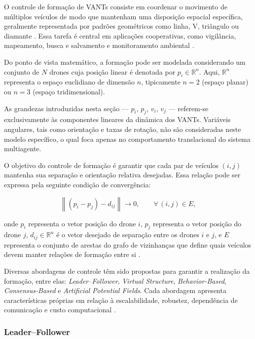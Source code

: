 O controle de formação de VANTs consiste em coordenar o movimento de múltiplos veículos de modo que mantenham uma disposição espacial específica, geralmente representada por padrões geométricos como linha, V, triângulo ou diamante \citep{bu2024advancement}. Essa tarefa é central em aplicações cooperativas, como vigilância, mapeamento, busca e salvamento e monitoramento ambiental \citep{bu2024advancement, ouyang2023formation}.

Do ponto de vista matemático, a formação pode ser modelada considerando um conjunto de $N$ drones cuja posição linear é denotada por $p_i \in \mathbb{R}^n$. Aqui, $\mathbb{R}^n$ representa o espaço euclidiano de dimensão $n$, tipicamente $n = 2$ (espaço planar) ou $n = 3$ (espaço tridimensional).

As grandezas introduzidas nesta seção — $p_i$, $p_j$, $v_i$, $v_j$ — referem-se exclusivamente às componentes lineares da dinâmica dos VANTs. Variáveis angulares, tais como orientação e taxas de rotação, não são consideradas neste modelo específico, o qual foca apenas no comportamento translacional do sistema multiagente.

O objetivo do controle de formação é garantir que cada par de veículos $(i, j)$ mantenha sua separação e orientação relativa desejadas. Essa relação pode ser expressa pela seguinte condição de convergência:

\begin{equation}
\label{eq:formation_constraint}
\left\| (p_i - p_j) - d_{ij} \right\| \rightarrow 0, 
\qquad \forall \,(i,j) \in E,
\end{equation}

onde $p_{i}$ representa o vetor posição do drone $i$, $p_{j}$ representa o vetor posição do drone $j$, $d_{ij} \in \mathbb{R}^n$ é o vetor desejado de separação entre os drones $i$ e $j$, e $E$ representa o conjunto de arestas do grafo de vizinhanças que define quais veículos devem manter relações de formação entre si \citep{bu2024advancement, ouyang2023formation}.

Diversas abordagens de controle têm sido propostas para garantir a realização da formação, entre elas: \textit{Leader–Follower}, \textit{Virtual Structure}, \textit{Behavior-Based}, \textit{Consensus-Based} e \textit{Artificial Potential Fields}. Cada abordagem apresenta características próprias em relação à escalabilidade, robustez, dependência de comunicação e custo computacional \citep{bu2024advancement, ouyang2023formation}.


\subsubsection{Leader–Follower}

